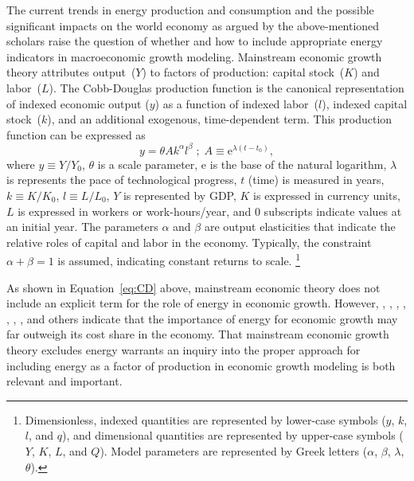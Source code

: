 \documentclass[preprint,authoryear,12pt]{elsarticle}\usepackage[]{graphicx}\usepackage[]{color}
\begin{document}
The current trends in energy production and consumption and 
the possible significant impacts on the world economy 
as argued by the above-mentioned scholars 
raise the question of
whether and how to include appropriate energy indicators 
in macroeconomic growth modeling.  
Mainstream economic growth theory attributes output~($Y$) to factors of production:
capital stock~($K$) and labor~($L$). 
The Cobb-Douglas production function 
is the canonical representation of indexed economic output ($y$) as a function of indexed 
labor~($l$), indexed capital stock~($k$), and an additional exogenous, time-dependent 
term.
This production function can be expressed as
%
\begin{equation} \label{eq:CD}
  y = \theta A k^\alpha l^\beta \; ; \; A \equiv \mathrm{e}^{\lambda(t-t_0)},
\end{equation}
%
\noindent where 
$y \equiv Y/Y_{0}$,
$\theta$ is a scale parameter,
e is the base of the natural logarithm, 
$\lambda$ is represents the pace of technological progress,
$t$ (time) is measured in years,
$k \equiv K/K_{0}$, 
$l \equiv L/L_{0}$, 
$Y$ is represented by GDP, 
$K$ is expressed in currency units, 
$L$ is expressed in workers or work-hours/year, and
0 subscripts indicate values at an initial year.
The parameters $\alpha$ and $\beta$ are output elasticities
that indicate the relative roles 
of capital and labor in the economy.
Typically, the constraint $\alpha + \beta = 1$ is assumed, 
indicating constant returns to scale.%
  \footnote{Dimensionless, indexed quantities are represented by 
  lower-case symbols 
  ($y$, $k$, $l$, and $q$), and dimensional 
  quantities are represented by upper-case symbols 
  ($Y$, $K$, $L$, and $Q$). 
  Model parameters are represented by Greek letters
  ($\alpha$, $\beta$, $\lambda$, $\theta$).} 


As shown in Equation~\ref{eq:CD} above, mainstream economic theory does not 
include an explicit term for the role of energy in economic growth. 
However, \citet{Bashmakov:2007ek}, \citet{Hamilton:2009ui}, \citet{Murphy:2011jh}, 
\citet{Benes:2012tm}, \citet{Kumhof:2012ua}, \cite{Ayres:2010ug}, 
\citet{Ayres:2013aa}, and others indicate that the 
importance of energy for economic growth may far outweigh its cost share in the 
economy. 
That mainstream economic growth theory excludes energy warrants
an inquiry into the proper approach for including energy 
as a factor of production in economic growth modeling is both relevant and important.
\end{document}
